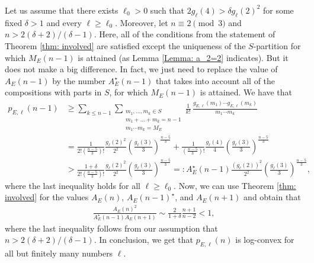 \documentclass[12pt]{amsart}
\theoremstyle{definition}
\theoremstyle{remark}
\numberwithin{theorem}{section} \numberwithin{equation}{section}
\begin{document}
\subsubsection{}

Let us assume that there exists $\ell_0>0$ such that $2g_\ell(4)>\delta g_\ell(2)^{2}
$ for some fixed $\delta>1$ and every $\ell\geq\ell_0$. Moreover, let $n\equiv2\pmod{3}$ and $n>2(\delta+2)/(\delta-1)$. Here, all of the conditions from the statement of Theorem \ref{thm: involved} are satisfied except the uniqueness of the
$S$-partition for which $M_E(n-1)$ is attained (as Lemma \ref{Lemma: a_2=2} indicates). But it does not make a big difference. In fact, we just need to replace the value of $A_E(n-1)$ by the number $A_E^\star(n-1)$ that takes into account all of the compositions
with parts in $S$, for which $M_E(n-1)$ is attained. We have that
\begin{align*}
p_{E,\ell }(n-1) &\geq  \sum _{k\leq n-1}\sum _{\substack{ m_1,\ldots,m_k\in S \\ m_{1}+\ldots +m_{k}=n-1  \\ m_1\cdots m_k=M_E}}
\frac{1}{k!} \, 
\frac{g_{E,\ell }\left( m_{1}\right) 
\cdots g_{E,\ell }\left( m_{k}\right) }{m_{1}\cdots m_{k}}\\
&=\frac{1}{2!\left(\frac{n-5}{3}\right)!}\frac{g_\ell(2)^2}{2^2}\left(\frac{g_\ell(3)}{3}\right)^{\frac{n-5}{3}}+\frac{1}{\left(\frac{n-5}{3}\right)!}\frac{g_\ell(4)}{4}\left(\frac{g_\ell(3)}{3}\right)^{\frac{n-5}{3}}\\
&>\frac{1+\delta}{2!\left(\frac{n-5}{3}\right)!}\frac{g_\ell(2)^2}{2^2}\left(\frac{g_\ell(3)}{3}\right)^{\frac{n-5}{3}}=:A_E^\star(n-1)
\frac{\left(
g_{\ell }\left( 2\right)
\right) ^{2}}{2^{2}}\left(
\frac{g_{\ell }\left( 3\right)
}{3}\right) ^{\frac{n-5}{3}},
\end{align*}
where the last inequality holds for all $\ell\geq\ell_0$. Now, we can use
Theorem \ref{thm: involved} for the values $A_E(n)$, $A_E(n-1)^\star$,
and $A_E(n+1)$ and obtain that
\begin{align*}
\frac{A_E(n)^2}{A_E^\star(n-1)A_E(n+1)}\sim\frac{2}{1+\delta}\frac{n+1}{n-
2}<1,
\end{align*}
where the last inequality follows from our assumption that $n>2(\delta+2)/(\delta-1)$. In conclusion, we get that $p_{E,\ell }\left( n\right)
$ is log-convex for all but finitely many numbers $\ell$.

\subsubsection{}
\end{document}
